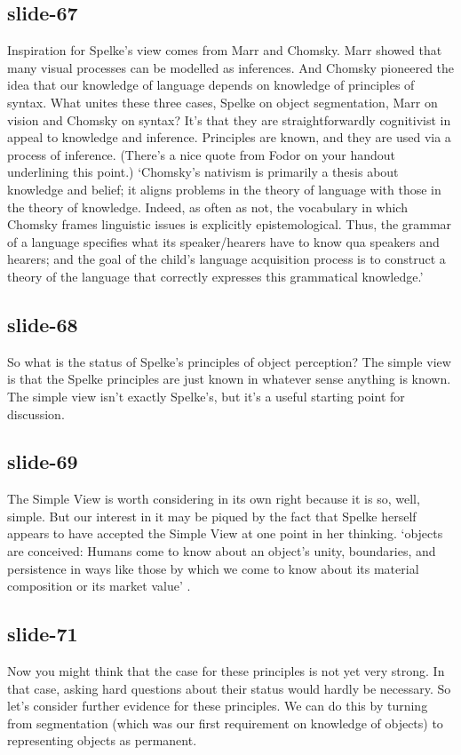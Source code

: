 \documentclass[12pt,\papersize]{extarticle}
\begin{document}
 
\subsection{slide-67}
Inspiration for Spelke’s view comes from Marr and Chomsky.
Marr showed that many visual processes can be modelled as inferences.
And Chomsky pioneered the idea that our knowledge of language depends on knowledge of principles of syntax.
What unites these three cases, Spelke on object segmentation, Marr on vision and Chomsky on syntax?
It’s that they are straightforwardly cognitivist in appeal to knowledge and inference.
Principles are known, and they are used via a process of inference.
(There’s a nice quote from Fodor on your handout underlining this point.)
‘Chomsky’s nativism is primarily a thesis about knowledge and belief; it aligns problems in the theory of language with those in the theory of knowledge. Indeed, as often as not, the vocabulary in which Chomsky frames linguistic issues is explicitly epistemological. Thus, the grammar of a language specifies what its speaker/hearers have to know qua speakers and hearers; and the goal of the child’s language acquisition process is to construct a theory of the language that correctly expresses this grammatical knowledge.’
\citep[p.\ 11]{Fodor:2000cj}
 
 
\subsection{slide-68}
So what is the status of Spelke’s principles of object perception?
The simple view is that the Spelke principles are just known in whatever sense anything is known.
The simple view isn’t exactly Spelke’s, but it’s a useful starting point for discussion.
 
 
\subsection{slide-69}
The Simple View is worth considering in its own right because it is so, well, simple. But our interest in it may be piqued by the fact that Spelke herself appears to have accepted the Simple View at one point in her thinking.
‘objects are conceived: Humans come to know about an object’s unity, boundaries, and persistence in ways like those by which we come to know about its material composition or its market value’
\citep[p.\ 198]{Spelke:1988xc}.
 
 
\subsection{slide-71}
Now you might think that the case for these principles is not yet very strong. In that case, asking hard questions about their status would hardly be necessary. So let’s consider further evidence for these principles. We can do this by turning from segmentation (which was our first requirement on knowledge of objects) to representing objects as permanent.
 
\end{document}
